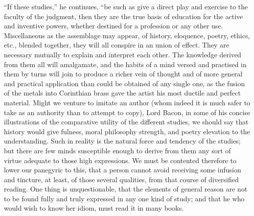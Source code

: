 ``If these studies,'' he continues, ``be such as give a
direct play and exercise to the faculty of the judgment, then they are
the true basis of education for the active and inventive powers,
whether destined for a profession or any other use. Miscellaneous as
the assemblage may appear, of history, eloquence, poetry, ethics,
etc., blended together, they will all conspire in an union of effect.
They are necessary mutually to explain and interpret each other. The
knowledge derived from them all will amalgamate, and the habits of a
mind versed and practised in them by turns will join to produce a
richer vein of thought and of more general and practical application
than could be obtained of any single one, as the fusion of the metals
into Corinthian brass gave the artist his most ductile and perfect
material. Might we venture to imitate an author (whom indeed it is
much safer to take as an authority than to attempt to copy), Lord
Bacon, in some of his concise illustrations of the comparative utility
of the different studies, we should say that history would give
fulness, moral philosophy strength, and poetry elevation to the
understanding. Such in reality is the natural force and tendency of
the studies; but there are few minds susceptible enough to derive from
them any sort of virtue adequate to those high expressions. We must be
contented therefore to lower our panegyric to this, that a
person cannot avoid receiving some infusion and tincture, at least, of
those several qualities, from that course of diversified reading. One
thing is unquestionable, that the elements of general reason are not
to be found fully and truly expressed in any one kind of study; and
that he who would wish to know her idiom, must read it in many books.

